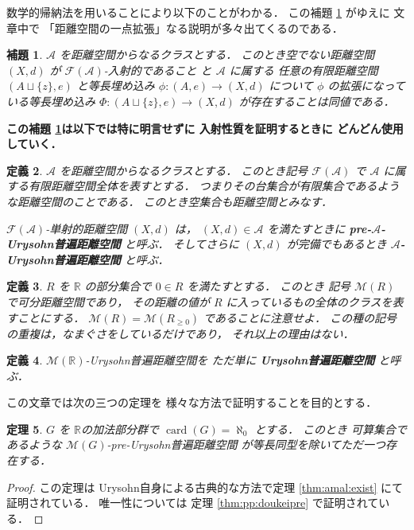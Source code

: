 \documentclass[leqno, 12pt]{jsarticle}
\newtheorem{thm}{定理}[section]
\newtheorem{lem}[thm]{補題}
\newtheorem{df}[thm]{定義}
\newcommand{\rr}{\mathbb{R}}
\DeclareMathOperator{\card}{card}
\begin{document}
数学的帰納法を用いることにより以下のことがわかる．
この補題
\ref{lem:intro:kihon}
がゆえに
文章中で
「距離空間の一点拡張」なる説明が多々出てくるのである．
\begin{lem}\label{lem:intro:kihon}
$\mathscr{A}$
を距離空間からなるクラスとする．
このとき空でない距離空間
$(X, d)$
が
$\mathscr{F}(\mathscr{A})$-入射的であること
と
$\mathscr{A}$
に属する
任意の有限距離空間
$(A\sqcup\{z\}, e)$
と等長埋め込み
$\phi\colon  (A, e)\to (X, d)$
について
$\phi$
の拡張になっている等長埋め込み
$\Phi\colon  (A\sqcup\{z\}, e)\to (X, d)$
が存在することは同値である．
\end{lem}
\textbf{この補題 \ref{lem:intro:kihon}は以下では特に明言せずに
入射性質を証明するときに
どんどん使用していく．}


\begin{df}\label{df:intro:Urysohn}
$\mathscr{A}$
を距離空間からなるクラスとする．
このとき記号
$\mathscr{F}(\mathscr{A})$
で
$\mathscr{A}$
に属する有限距離空間全体を表すとする．
つまりその台集合が有限集合であるような距離空間のことである．
このとき空集合も距離空間とみなす．

$\mathscr{F}(\mathscr{A})$-単射的距離空間
$(X, d)$
は，
$(X, d)\in \mathscr{A}$
を満たすときに
\textbf{pre-$\mathscr{A}$-Urysohn普遍距離空間}
と呼ぶ．
そしてさらに
$(X, d)$
が完備でもあるとき
\textbf{$\mathscr{A}$-Urysohn普遍距離空間}
と呼ぶ．
\end{df}



\begin{df}\label{df:intoro:cat}
$R$
を
$\rr$
の部分集合で
$0\in R$
を満たすとする．
このとき
記号
$\mathscr{M}(R)$
で可分距離空間であり，
その距離の値が
$R$
に入っているもの全体のクラスを表すことにする．
$\mathscr{M}(R)=\mathscr{M}(R_{\ge 0})$
であることに注意せよ．
この種の記号の重複は，なまぐさをしているだけであり，
それ以上の理由はない．
\end{df}




\begin{df}\label{df:intro:originalUrysohn}
$\mathscr{M}(\rr)$-Urysohn普遍距離空間を
ただ単に
\textbf{Urysohn普遍距離空間}
と呼ぶ．
\end{df}


この文章では次の三つの定理を
様々な方法で証明することを目的とする．



\begin{thm}\label{thm:intro:existpre}
$G$
を
$\rr$の加法部分群で
$\card(G)=\aleph_0$
とする．
このとき
可算集合であるような
$\mathscr{M}(G)$-pre-Urysohn普遍距離空間
が等長同型を除いてただ一つ存在する．
\end{thm}
\begin{proof}
この定理は
Urysohn自身による古典的な方法で定理 
\ref{thm:amal:exist}
にて証明されている．
唯一性については
定理 \ref{thm:pp:doukeipre}
で証明されている．
\end{proof}
\end{document}
